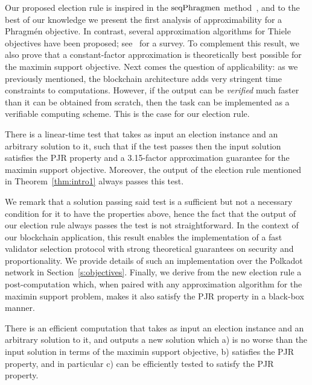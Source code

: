 Our proposed election rule is inspired in the $\operatorname{seqPhragmen}$ method~\cite{brill2017phragmen}, and to the best of our knowledge we present the first analysis of approximability for a Phragm\'{e}n objective. 
In contrast, several approximation algorithms for Thiele objectives have been proposed; see~\cite{lackner2020approval} for a survey. To complement this result, we also prove that a constant-factor approximation is theoretically best possible for the maximin support objective. 
%
Next comes the question of applicability: as we previously mentioned, the blockchain architecture adds very stringent time constraints to computations. However, if the output can be \emph{verified} much faster than it can be obtained from scratch, then the task can be implemented as a verifiable computing scheme. This is the case for our election rule.

\begin{theorem}\label{thm:intro2}
There is a linear-time test that takes as input an election instance and an arbitrary solution to it, such that if the test passes then the input solution satisfies the PJR property and a 3.15-factor approximation guarantee for the maximin support objective. 
Moreover, the output of the election rule mentioned in Theorem~\ref{thm:intro1} always passes this test.
\end{theorem}

We remark that a solution passing said test is a sufficient but not a necessary condition for it to have the properties above, hence the fact that the output of our election rule always passes the test is not straightforward.
In the context of our blockchain application, this result enables the implementation of a fast validator selection protocol with strong theoretical guarantees on security and proportionality. 
We provide details of such an implementation over the Polkadot network in Section~\ref{s:objectives}.
%
Finally, we derive from the new election rule a post-computation which, when paired with any approximation algorithm for the maximin support problem, makes it also satisfy the PJR property in a black-box manner.

\begin{theorem}\label{thm:intro3}
There is an efficient computation that takes as input an election instance and an arbitrary solution to it, and outputs a new solution which a) is no worse than the input solution in terms of the maximin support objective, b) satisfies the PJR property, and in particular c) can be efficiently tested to satisfy the PJR property.
\end{theorem}

